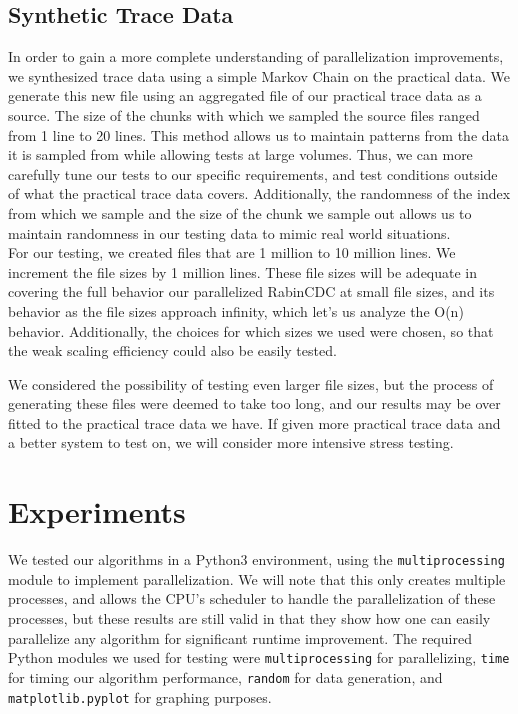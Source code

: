 \documentclass{acmtog} %
\begin{document}
	\subsection{Synthetic Trace Data}
	In order to gain a more complete understanding of parallelization improvements, we synthesized trace data using a simple Markov Chain on the practical data. We generate this new file using an aggregated file of our practical trace data as a source. The size of the chunks with which we sampled the source files ranged from 1 line to 20 lines. This method allows us to maintain patterns from the data it is sampled from while allowing tests at large volumes. Thus, we can more carefully tune our tests to our specific requirements, and test conditions outside of what the practical trace data covers. Additionally, the randomness of the index from which we sample and the size of the chunk we sample out allows us to maintain randomness in our testing data to mimic real world situations.\\
	
	For our testing, we created files that are 1 million to 10 million lines. We increment the file sizes by 1 million lines. These file sizes will be adequate in covering the full behavior our parallelized RabinCDC at small file sizes, and its behavior as the file sizes approach infinity, which let's us analyze the O(n) behavior. Additionally, the choices for which sizes we used were chosen, so that the weak scaling efficiency could also be easily tested.
	
	We considered the possibility of testing even larger file sizes, but the process of generating these files were deemed to take too long, and our results may be over fitted to the practical trace data we have. If given more practical trace data and a better system to test on, we will consider more intensive stress testing.
	
	
	\section{Experiments}
	We tested our algorithms in a Python3 environment, using the \texttt{multiprocessing} module to implement parallelization. We will note that this only creates multiple processes, and allows the CPU's scheduler to handle the parallelization of these processes, but these results are still valid in that they show how one can easily parallelize any algorithm for significant runtime improvement. The required Python modules we used for testing were \texttt{multiprocessing} for parallelizing, \texttt{time} for timing our algorithm performance, \texttt{random} for data generation, and \texttt{matplotlib.pyplot} for graphing purposes. 
	
\end{document}
